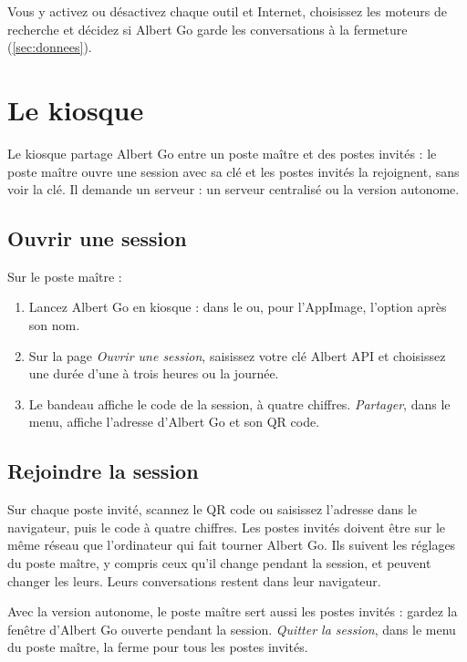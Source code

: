 \documentclass[a4paper, 11pt]{article}
\begin{document}
Vous y activez ou désactivez chaque outil et Internet, choisissez les moteurs de recherche et décidez si Albert Go garde les conversations à la fermeture (\autoref{sec:donnees}).

\section{Le kiosque}
\label{sec:kiosque}

Le kiosque partage Albert Go entre un poste maître et des postes invités : le poste maître ouvre une session avec sa clé et les postes invités la rejoignent, sans voir la clé. Il demande un serveur : un serveur centralisé ou la version autonome.

\subsection{Ouvrir une session}

Sur le poste maître :
\begin{enumerate}
  \item Lancez Albert Go en kiosque :  dans le  ou, pour l'AppImage, l'option  après son nom.
  \item Sur la page \emph{Ouvrir une session}, saisissez votre clé Albert API et choisissez une durée d'une à trois heures ou la journée.
  \item Le bandeau affiche le code de la session, à quatre chiffres. \emph{Partager}, dans le menu, affiche l'adresse d'Albert Go et son QR code.
\end{enumerate}

\subsection{Rejoindre la session}

Sur chaque poste invité, scannez le QR code ou saisissez l'adresse dans le navigateur, puis le code à quatre chiffres. Les postes invités doivent être sur le même réseau que l'ordinateur qui fait tourner Albert Go. Ils suivent les réglages du poste maître, y compris ceux qu'il change pendant la session, et peuvent changer les leurs. Leurs conversations restent dans leur navigateur.

Avec la version autonome, le poste maître sert aussi les postes invités : gardez la fenêtre d'Albert Go ouverte pendant la session. \emph{Quitter la session}, dans le menu du poste maître, la ferme pour tous les postes invités.
\end{document}
